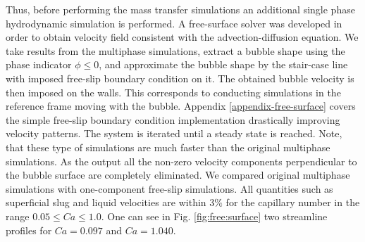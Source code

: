 \documentclass{article}
\begin{document}
\begin{description}
Thus, before performing the mass transfer simulations an additional single phase hydrodynamic
simulation is performed. A free-surface solver was developed in order to obtain velocity field
consistent with the advection-diffusion equation. We take results from the
multiphase simulations, extract a
bubble shape using the phase indicator $\phi\leq0$, and approximate the bubble shape by the stair-case
line with imposed free-slip boundary condition on it. The obtained bubble velocity is then imposed on the walls. This corresponds to conducting 
simulations in the reference frame moving with the bubble. Appendix \ref{appendix-free-surface} covers the simple
free-slip boundary condition implementation drastically improving velocity patterns. The system is
iterated until a
steady state is reached. Note, that these type of simulations are much faster than the original
multiphase simulations. As the output all the non-zero velocity components perpendicular to the
bubble surface are completely eliminated. We compared original multiphase simulations with
one-component free-slip simulations. All quantities such as superficial slug and liquid velocities are
within $3\%$ for the capillary number in the range $0.05\leq Ca \leq 1.0$. 
One can see in Fig. \ref{fig:free:surface} two streamline profiles for $Ca=0.097$  and $Ca=1.040$.
\begin{figure}[htb!]

\end{figure}
\end{description}
\end{document}
